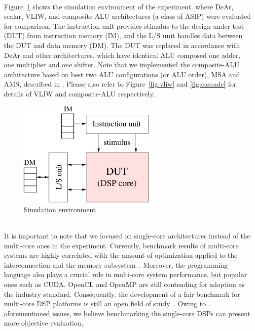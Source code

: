 \\\indent Figure~\ref{fig:sim} shows the simulation environment of the experiment, 
where DeAr, scalar, VLIW, and composite-ALU architectures (a class of ASIP) \cite{cascade} were evaluated for comparison. 
The instruction unit provides stimulus to the design under test (DUT) from instruction memory (IM),
and the L/S unit handles data between the DUT and data memory (DM).
The DUT was replaced in accordance with DeAr and other architectures, 
which have identical ALU composed one adder, one multiplier and one shifter.
Note that we implemented the composite-ALU architecture based on best two ALU configurations (or ALU order), MSA and AMS, described in \cite{cascade}.
Please also refer to Figure~\ref{fig:vliw} and \ref{fig:cascade} for details of VLIW and composite-ALU respectively.
\vspace{\textfig}
\begin{figure}[!ht] 
    \centering
    \includegraphics[width=0.6\textwidth]{./figs/sim.eps}
    \caption{Simulation environment}
    \label{fig:sim}
\end{figure}
\\\indent 
It is important to note that we focused on single-core architectures instead of the multi-core ones in the experiment.
Currently, benchmark results of multi-core systems are highly correlated with the amount of optimization applied to the interconnection and the memory subsystem~\cite{trends}.
Moreover, the programming language also plays a crucial role in multi-core system performance, 
but popular ones such as CUDA, OpenCL and OpenMP are still contending for adoption as the industry standard.
Consequently, the development of a fair benchmark for multi-core DSP platforms is still an open field of study~\cite{landscape}.
Owing to aforementioned issues, we believe benchmarking the single-core DSPs can present more objective evaluation, 
